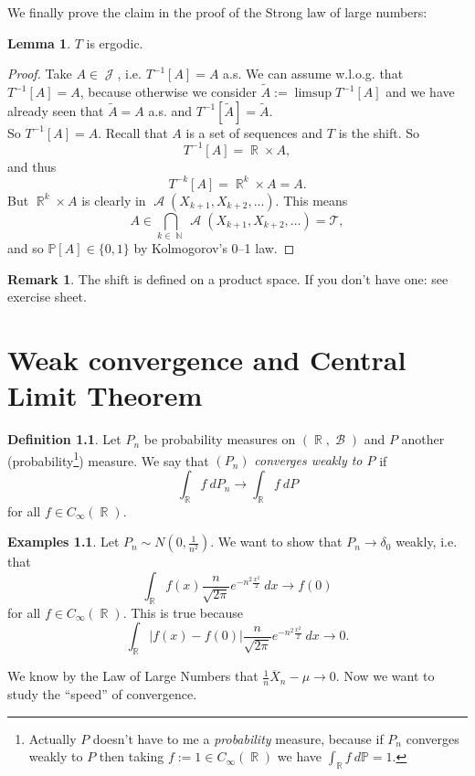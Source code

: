 \documentclass[12pt,a4paper]{report}
\theoremstyle{definition}
\newtheorem{lemma}[theorem]{Lemma}
\newtheorem{definition}[theorem]{Definition}
\newtheorem*{examples}{Examples}
\newtheorem*{remark}{Remark}
\theoremstyle{num.custom-title}
\DeclareMathOperator{\A}{\mathcal{A}}
\DeclareMathOperator{\B}{\mathcal{B}}
\DeclareMathOperator{\J}{\mathcal{J}}
\DeclareMathOperator{\N}{\mathbb{N}}
\DeclareMathOperator{\R}{\mathbb{R}}
\newcommand{\ol}{\overline}
\newcommand{\T}{\mathcal{T}}
\renewcommand{\1}{\mathbbm{1}}
\renewcommand{\P}{\mathbb{P}}
\begin{document}
We finally prove the claim in the proof of the Strong law of large numbers:

\begin{lemma}
$T$ is ergodic.
\begin{proof}
Take $A \in \J$, i.e. $T^{-1}[A]=A$ a.s. We can assume w.l.o.g. that $T^{-1}[A]=A$, because otherwise we consider $\tilde{A} := \limsup T^{-1}[A]$ and we have already seen that $\tilde{A}=A$ a.s. and $T^{-1}[\tilde{A}]=\tilde{A}$.\\
So $T^{-1}[A]=A$. Recall that $A$ is a set of sequences and $T$ is the shift. So
\[
T^{-1}[A] = \R \times A,
\]
and thus
\[
T^{-k}[A] = \R^k \times A = A.
\]
But $\R^k \times A$ is clearly in $\A(X_{k+1},X_{k+2},...)$. This means
\[
A \in \bigcap_{k \in \N} \A(X_{k+1},X_{k+2},\ldots) = \T,
\]
and so $\P[A] \in \{0,1\}$ by Kolmogorov's 0--1 law.
\end{proof}
\end{lemma}

\begin{remark}
The shift is defined on a product space. If you don't have one: see exercise sheet.
\end{remark}


\chapter{Weak convergence and Central Limit Theorem}

\begin{definition}
Let $P_n$ be probability measures on $(\R,\B)$ and $P$ another (probability\footnote{Actually $P$ doesn't have to me a \emph{probability} measure, because if $P_n$ converges weakly to $P$ then taking $f:=1 \in C_\infty(\R)$ we have $\int_{\R} f \ d\P = 1$.}) measure. We say that $(P_n)$ \emph{converges weakly to $P$} if 
\[
\int_{\R} f \ dP_n \to \int_{\R} f \ dP
\]
for all $f \in C_\infty(\R)$.
\end{definition}

\begin{examples}
Let $P_n \sim N(0,\frac{1}{n^2})$. We want to show that $P_n \to \delta_0$ weakly, i.e. that
\[
\int_{\R} f(x) \frac{n}{\sqrt{2\pi}} e^{-n^2 \frac{x^2}{2}} \ dx \to f(0)
\]
for all $f \in C_\infty(\R)$. This is true because
\[
\int_{\R} |f(x)-f(0)| \frac{n}{\sqrt{2\pi}} e^{-n^2 \frac{x^2}{2}} \ dx \to 0.
\]
\end{examples}

We know by the Law of Large Numbers that $\frac{1}{n} \ol{X}_n - \mu \to 0$. Now we want to study the ``speed'' of convergence.
\end{document}
